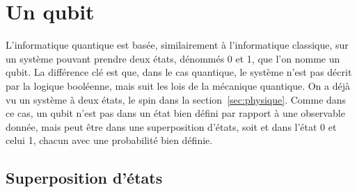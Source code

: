 \chapter{Un qubit}\label{ch:un-qubit}

L'informatique quantique est basée, similairement à l'informatique classique, sur un système pouvant prendre deux états,
dénommés 0 et 1, que l'on nomme un qubit.
La différence clé est que, dans le cas quantique, le système n'est pas décrit par la logique booléenne, mais suit les
lois de la mécanique quantique.
On a déjà vu un système à deux états, le spin dans la section~\ref{sec:physique}.
Comme dans ce cas, un qubit n’est pas dans un état bien défini par rapport à une observable donnée, mais peut être dans une superposition d'états,
soit et dans l'état 0 et celui 1, chacun avec une probabilité bien définie.

\section{Superposition d'états}\label{sec:superposition-d'etats}

